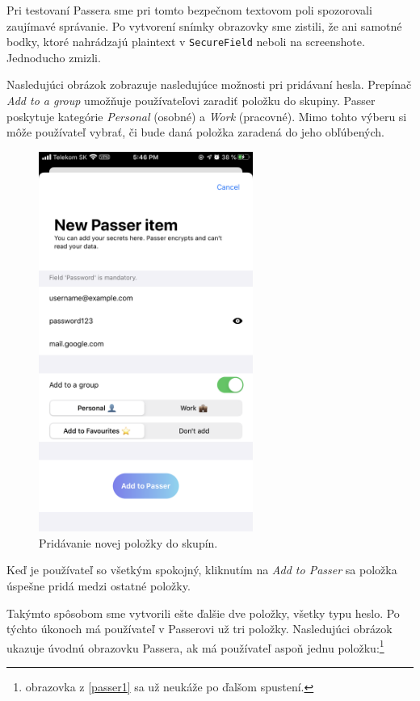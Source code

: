 Pri testovaní Passera sme pri tomto bezpečnom textovom poli spozorovali zaujímavé správanie. Po vytvorení snímky obrazovky sme zistili, že ani samotné bodky, ktoré nahrádzajú plaintext v \texttt{SecureField} neboli na screenshote. Jednoducho zmizli.

Nasledujúci obrázok zobrazuje nasledujúce možnosti pri pridávaní hesla. Prepínač \textit{Add to a group} umožňuje používateľovi zaradiť položku do skupiny. Passer poskytuje kategórie \textit{Personal} (osobné) a \textit{Work} (pracovné). Mimo tohto výberu si môže používateľ vybrať, či bude daná položka zaradená do jeho obľúbených. 

\begin{figure}[H]
  \centering
  \includegraphics[width=7cm]{img/passer3.PNG}
  \caption{Pridávanie novej položky do skupín.}
  \label{passer3}
\end{figure}

Keď je používateľ so všetkým spokojný, kliknutím na \textit{Add to Passer} sa položka úspešne pridá medzi ostatné položky.

Takýmto spôsobom sme vytvorili ešte ďalšie dve položky, všetky typu heslo. Po týchto úkonoch má používateľ v Passerovi už tri položky. Nasledujúci obrázok ukazuje úvodnú obrazovku Passera, ak má používateľ aspoň jednu položku:\footnote{obrazovka z \figurename{ \ref{passer1}} sa už neukáže po ďalšom spustení.} 


